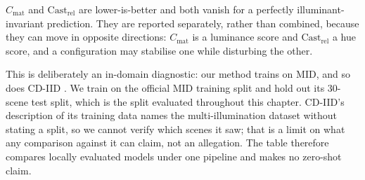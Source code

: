 $C_{\text{mat}}$ and $\text{Cast}_{\text{rel}}$ are lower-is-better and both vanish for
a perfectly illuminant-invariant prediction. They are reported separately, rather than
combined, because they can move in opposite directions: $C_{\text{mat}}$ is a luminance
score and $\text{Cast}_{\text{rel}}$ a hue score, and a configuration may stabilise one
while disturbing the other.

This is deliberately an in-domain diagnostic: our method trains on MID, and so does
CD-IID . We train on the official MID training split and hold
out its $30$-scene test split, which is the split evaluated throughout this chapter.
CD-IID's description of its training data names the multi-illumination dataset without
stating a split, so we cannot verify which scenes it saw; that is a limit on what any
comparison against it can claim, not an allegation. The table therefore compares
locally evaluated models under one pipeline and makes no zero-shot claim.


